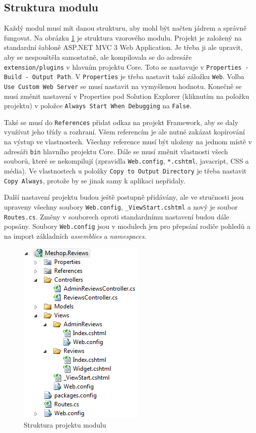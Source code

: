 \documentclass[11pt,twoside,a4paper]{book}
\begin{document}
\subsection{Struktura modulu}
Každý modul musí mít danou strukturu, aby mohl být načten jádrem a správně fungovat.
Na obrázku \ref{fig:modulstruktura} je struktura vzorového modulu. Projekt je založený na standardní šabloně \textsf{ASP.NET MVC 3 Web Application}. Je třeba ji ale upravit, aby se nespouštěla samostatně, ale kompilovala se do adresáře \texttt{extension/plugins} v hlavním projektu \textsf{Core}. Toto se nastavuje v \texttt{Properties - Build - Output Path}. V \texttt{Properties} je třeba nastavit také záložku \texttt{Web}. Volba \texttt{Use Custom Web Server} se musí nastavit na vymyšlenou hodnotu. Konečně se musí změnit nastavení v Properties pod Solution Explorer (kliknutím na položku projektu) v položce \texttt{Always Start When Debugging} na \texttt{False}.

Také se musí do \texttt{References} přidat odkaz na projekt \textsf{Framework}, aby se daly využívat jeho třídy a rozhraní. Všem referencím je ale nutné zakázat kopírování na výstup ve vlastnostech. Všechny reference musí být uloženy na jednom místě v adresáři \texttt{bin} hlavního projektu \textsf{Core}. Dále se musí změnit vlastnosti všech souborů, které se nekompilují (zpravidla \texttt{Web.config}, \texttt{*.cshtml}, javacript, CSS a média). Ve vlastnostech u položky \texttt{Copy to Output Directory} je třeba nastavit \texttt{Copy Always}, protože by se jinak samy k aplikaci nepřidaly.

Další nastavení projektu budou ještě postupně přidávány, ale ve stručnosti jsou upraveny všechny soubory \texttt{Web.config}, \texttt{\_ViewStart.cshtml} a nový je soubor \texttt{Routes.cs}. Změny v souborech oproti standardnímu nastavení budou dále popsány. Soubory \texttt{Web.config} jsou v modulech jen pro přepsání rodiče pohledů a na import základních \textit{assemblies} a \textit{namespaces}.
\begin{figure}[h!]
\begin{center}
\includegraphics[scale=1]{figures/modulstruktura}
\caption{Struktura projektu modulu}
\label{fig:modulstruktura}
\end{center}
\end{figure}
\end{document}
